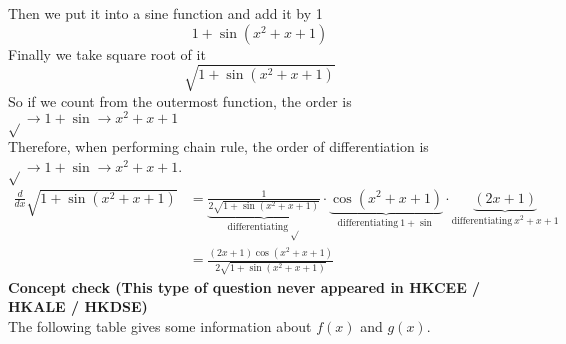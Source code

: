\documentclass{article}
\begin{document}
Then we put it into a sine function and add it by 1
\begin{equation*}
    1+\sin\left( x^{2} +x+1\right)
\end{equation*}
Finally we take square root of it
\begin{equation*}
    \sqrt{1+\sin\left( x^{2} +x+1\right)}
\end{equation*}
So if we count from the outermost function,
the order is $\displaystyle \sqrt{}\rightarrow 1+\sin\rightarrow x^{2} +x+1$\\
Therefore, when performing chain rule,
the order of differentiation is $\displaystyle \sqrt{}\rightarrow 1+\sin\rightarrow x^{2} +x+1$.
\begin{equation*}
\begin{aligned}
    \frac{d}{dx}\sqrt{1+\sin\left( x^{2} +x+1\right)} & =\underbrace{\frac{1}{2\sqrt{1+\sin\left( x^{2} +x+1\right)}}}_{\text{differentiating} \ \sqrt{}} \cdot \underbrace{\cos\left( x^{2} +x+1\right)}_{\text{differentiating} \ 1+\sin} \cdot \underbrace{( 2x+1)}_{\text{differentiating} \ x^{2} +x+1}\\
    & =\frac{( 2x+1)\cos\left( x^{2} +x+1\right)}{2\sqrt{1+\sin\left( x^{2} +x+1\right)}}
\end{aligned}
\end{equation*}
\clearpage
\pagebreak
\noindent\textbf{Concept check (This type of question never appeared in HKCEE / HKALE / HKDSE)}\\
The following table gives some information about $f(x)$ and $g(x)$.
\end{document}
